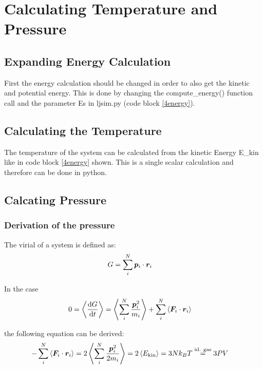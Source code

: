 \section{Calculating Temperature and Pressure}

\subsection{Expanding Energy Calculation}

First the energy calculation should be changed in order to also get the kinetic and potential energy.
This is done by changing the compute\_energy() function call and the parameter Es in ljsim.py (code block \ref{4energy}).


\subsection{Calculating the Temperature}

The temperature of the system can be calculated from the kinetic Energy E\_kin like in code block \ref{4energy} shown. This is a single scalar calculation and therefore can be done in python.

\subsection{Calcating Pressure}

\subsubsection*{Derivation of the pressure}

The virial of a system is defined as:
\begin{align}
G
	&=\sum_i^N\boldsymbol{p}_i\cdot\boldsymbol{r}_i
	\label{4p1}
\end{align}

In the case
\begin{align}
0
	&=\left\langle\frac{\text{d} G}{\text{d} t}\right\rangle 
	=\left\langle\sum_i^N\frac{\boldsymbol{p}_i^2}{m_i}\right\rangle+\sum_i^N\left\langle\boldsymbol{F}_i\cdot\boldsymbol{r}_i\right\rangle
	\label{4p2}
\end{align}

the following equation can be derived:
\begin{align}
-\sum_i^N\left\langle\boldsymbol{F}_i\cdot\boldsymbol{r}_i\right\rangle
	&=2\left\langle\sum_i^N\frac{\boldsymbol{p}_i^2}{2m_i}\right\rangle
	=2\left\langle E_\text{kin}\right\rangle
	=3Nk_BT
	\stackrel{\text{id. gas}}{=}3PV
	\label{4p3}
\end{align}

